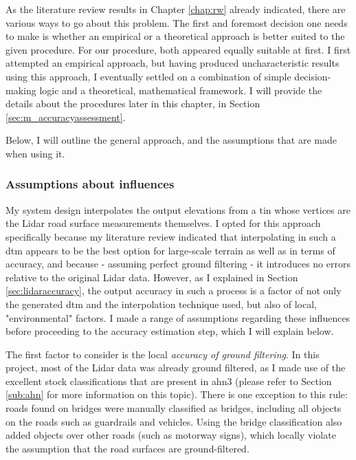 As the literature review results in Chapter \ref{chap:rw} already indicated, there are various ways to go about this problem. The first and foremost decision one needs to make is whether an empirical or a theoretical approach is better suited to the given procedure. For our procedure, both appeared equally suitable at first. I first attempted an empirical approach, but having produced uncharacteristic results using this approach, I eventually settled on a combination of simple decision-making logic and a theoretical, mathematical framework. I will provide the details about the procedures later in this chapter, in Section \ref{sec:m_accuracyassessment}.

Below, I will outline the general approach, and the assumptions that are made when using it.

\subsubsection{Assumptions about influences}

My system design interpolates the output elevations from a \ac{tin} whose vertices are the Lidar road surface measurements themselves. I opted for this approach specifically because my literature review indicated that interpolating in such a \ac{dtm} appears to be the best option for large-scale terrain as well as in terms of accuracy, and because - assuming perfect ground filtering - it introduces no errors relative to the original Lidar data. However, as I explained in Section \ref{sec:lidaraccuracy}, the output accuracy in such a process is a factor of not only the generated \ac{dtm} and the interpolation technique used, but also of local, "environmental" factors. I made a range of assumptions regarding these influences before proceeding to the accuracy estimation step, which I will explain below.

The first factor to consider is the local \textit{accuracy of ground filtering}. In this project, most of the Lidar data was already ground filtered, as I made use of the excellent stock classifications that are present in \ac{ahn3} (please refer to Section \ref{sub:ahn} for more information on this topic). There is one exception to this rule: roads found on bridges were manually classified as bridges, including all objects on the roads such as guardrails and vehicles. Using the bridge classification also added objects over other roads (such as motorway signs), which locally violate the assumption that the road surfaces are ground-filtered.


